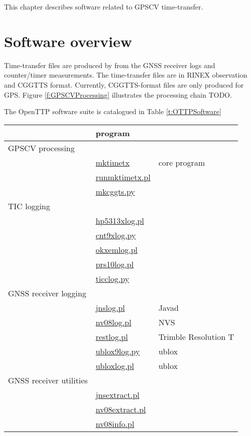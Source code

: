 
This chapter describes software related to GPSCV time-transfer.


\section{Software overview}

Time-transfer files are produced by  from the GNSS receiver logs and counter/timer measurements.
The time-transfer files are in  RINEX observation  and CGGTTS format. 
Currently, CGGTTS-format files are only produced for GPS. 
Figure \ref{f:GPSCVProcessing} illustrates the processing chain TODO. 

The OpenTTP software suite is catalogued in Table \ref{t:OTTPSoftware}
\begin{table}
\begin{tabular}{l|l|l}
	& program & \\ 
	\hline
GPSCV processing  &  & \\
	& \hyperlink{h:mktimetx}{mktimetx} & core program\\
	& \hyperlink{h:runmktimetx}{runmktimetx.pl} & \\
	& \hyperlink{h:mkcggtts}{mkcggts.py} & \\
	\hline
TIC logging & & \\
	& \hyperlink{h:hp5313xlog}{hp5313xlog.pl} &\\
	& \hyperlink{h:cnt9xlog}{cnt9xlog.py} &\\
	& \hyperlink{h:okxemlog}{okxemlog.pl} & \\
	& \hyperlink{h:prs10log}{prs10log.pl} & \\
	& \hyperlink{h:ticclog}{ticclog.py} & \\
	\hline
GNSS receiver logging & & \\
	&	\hyperlink{h:jnslog}{jnslog.pl} & Javad\\
	& \hyperlink{h:nvslog}{nv08log.pl} & NVS\\
	& \hyperlink{h:restlog}{restlog.pl} & Trimble Resolution T\\
	& \hyperlink{h:ublox9log}{ublox9log.py} & ublox\\
	& \hyperlink{h:ubloxlog}{ubloxlog.pl} & ublox\\
GNSS receiver utilities & & \\
	& \hyperlink{h:jnsextract}{jnsextract.pl} & \\
	& \hyperlink{h:nv08extract}{nv08extract.pl} & \\
	& \hyperlink{h:nv08info}{nv08info.pl} & \\

\end{tabular}
\end{table}

